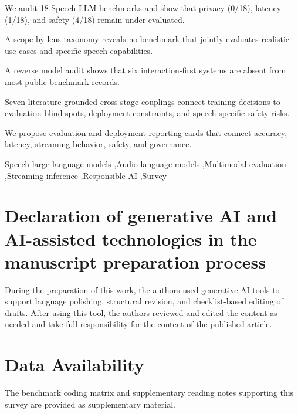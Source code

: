 \documentclass[a4paper,fleqn]{cas-sc}
\begin{document}
\begin{highlights}
\item We audit 18 Speech LLM benchmarks and show that privacy (0/18), latency (1/18), and safety (4/18) remain under-evaluated.
\item A scope-by-lens taxonomy reveals no benchmark that jointly evaluates realistic use cases and specific speech capabilities.
\item A reverse model audit shows that six interaction-first systems are absent from most public benchmark records.
\item Seven literature-grounded cross-stage couplings connect training decisions to evaluation blind spots, deployment constraints, and speech-specific safety risks.
\item We propose evaluation and deployment reporting cards that connect accuracy, latency, streaming behavior, safety, and governance.
\end{highlights}

\begin{keywords}
Speech large language models \sep Audio language models \sep Multimodal evaluation \sep Streaming inference \sep Responsible AI \sep Survey
\end{keywords}

\let\printorcid\relax

\maketitle











\FloatBarrier
\section*{Declaration of generative AI and AI-assisted technologies in the manuscript preparation process}
During the preparation of this work, the authors used generative AI tools to support language polishing, structural revision, and checklist-based editing of drafts. After using this tool, the authors reviewed and edited the content as needed and take full responsibility for the content of the published article.

\section*{Data Availability}
The benchmark coding matrix and supplementary reading notes supporting this survey are provided as supplementary material.



\end{document}
